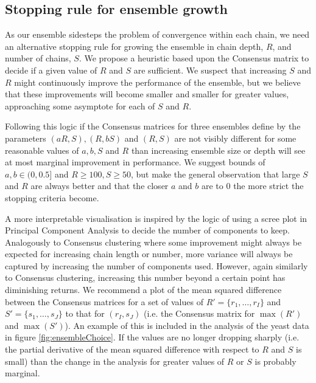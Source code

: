 \documentclass[]{article}
\begin{document}

\subsection{Stopping rule for ensemble growth} \label{sec:stopping}
As our ensemble sidesteps the problem of convergence within each chain, we need an alternative stopping rule for growing the ensemble in chain depth, $R$, and number of chains, $S$. We propose a heuristic based upon the Consensus matrix to decide if a given value of $R$ and $S$ are sufficient. We suspect that increasing $S$ and $R$ might continuously improve the performance of the ensemble, but we believe that these improvements will become smaller and smaller for greater values, approaching some asymptote for each of $S$ and $R$. 

Following this logic if the Consensus matrices for three ensembles define by the parameters $(aR, S), (R, bS)$ and $(R, S)$ are not visibly different for some reasonable values of $a, b, S$ and $R$ than increasing ensemble size or depth will see at most marginal improvement in performance. We suggest bounds of $a, b \in (0, 0.5]$ and $R \geq 100, S \geq 50$, but make the general observation that large $S$ and $R$ are always better and that the closer $a$ and $b$ are to 0 the more strict the stopping criteria become.

A more interpretable visualisation is inspired by the logic of using a scree plot in Principal Component Analysis to decide the number of components to keep. Analogously to Consensus clustering where some improvement might always be expected for increasing chain length or number, more variance will always be captured by increasing the number of components used. However, again similarly to Consensus clustering, increasing this number beyond a certain point has diminishing returns. We recommend a plot of the mean squared difference between the Consensus matrices for a set of values of $R' = \{r_1, \ldots, r_I\}$ and $S'=\{s_1, \ldots, s_J\}$ to that for $(r_I, s_J)$ (i.e. the Consensus matrix for $\max(R')$ and $\max(S')$). An example of this is included in the analysis of the yeast data in figure \ref{fig:ensembleChoice}. If the values are no longer dropping sharply (i.e. the partial derivative of the mean squared difference with respect to $R$ and $S$ is small) than the change in the analysis for greater values of $R$ or $S$ is probably marginal.
\end{document}
